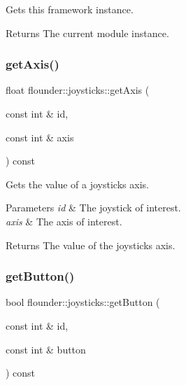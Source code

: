 Gets this framework instance. 

\begin{DoxyReturn}{Returns}
The current module instance. 
\end{DoxyReturn}
\mbox{\label{classflounder_1_1joysticks_a140f205a6e28354a9d95cff5fbdce318}} 
\subsubsection{\texorpdfstring{get\+Axis()}{getAxis()}}
{\footnotesize\ttfamily float flounder\+::joysticks\+::get\+Axis (\begin{DoxyParamCaption}\item[{const int \&}]{id,  }\item[{const int \&}]{axis }\end{DoxyParamCaption}) const\hspace{0.3cm}{\ttfamily [inline]}}



Gets the value of a joysticks axis. 


\begin{DoxyParams}{Parameters}
{\em id} & The joystick of interest. \\
\hline
{\em axis} & The axis of interest. \\
\hline
\end{DoxyParams}
\begin{DoxyReturn}{Returns}
The value of the joystick\textquotesingle{}s axis. 
\end{DoxyReturn}
\mbox{\label{classflounder_1_1joysticks_afc3effcb87566223f35bdb3130c8e4fa}} 
\subsubsection{\texorpdfstring{get\+Button()}{getButton()}}
{\footnotesize\ttfamily bool flounder\+::joysticks\+::get\+Button (\begin{DoxyParamCaption}\item[{const int \&}]{id,  }\item[{const int \&}]{button }\end{DoxyParamCaption}) const\hspace{0.3cm}{\ttfamily [inline]}}



